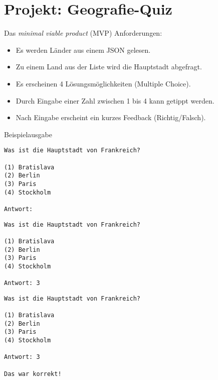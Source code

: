 \section{Projekt: Geografie-Quiz}


\begin{frame}
\begin{block}{Das \emph{minimal viable product} (MVP)}
\vspace{2pt}
Anforderungen: 
\pause 
\begin{itemize}[<+->]
	\item Es werden Länder aus einem JSON gelesen.
	\item Zu einem Land aus der Liste wird die Hauptstadt abgefragt.
	\item Es erscheinen 4 Lösungsmöglichkeiten (Multiple Choice).
	\item Durch Eingabe einer Zahl zwischen 1 bis 4 kann getippt werden. 
	\item Nach Eingabe erscheint ein kurzes Feedback (Richtig/Falsch).  
\end{itemize}
\end{block}
\end{frame}
	
\begin{fragile}
	
\begin{exampleblock}{Beispielausgabe}
\vspace{2pt}
\begin{overprint}
\begin{verbatim}
Was ist die Hauptstadt von Frankreich?

(1) Bratislava
(2) Berlin
(3) Paris
(4) Stockholm
 
Antwort: 
\end{verbatim}
\begin{verbatim}
Was ist die Hauptstadt von Frankreich?

(1) Bratislava
(2) Berlin
(3) Paris
(4) Stockholm

Antwort: 3
\end{verbatim}
\begin{verbatim}
Was ist die Hauptstadt von Frankreich?

(1) Bratislava
(2) Berlin
(3) Paris
(4) Stockholm

Antwort: 3

Das war korrekt!
\end{verbatim}
\end{overprint}
\end{exampleblock}
	
\end{fragile}

